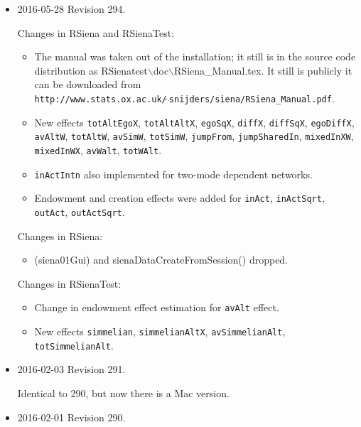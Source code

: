 \documentclass[a4paper,fleqn,11pt]{article}
\newcommand{\+}{\, + \,}
\newcommand{\sfn}[1]{\textsf{#1}}
\begin{document}
\begin{small}
\begin{itemize}
\item 2016-05-28 Revision 294.

Changes in RSiena and RSienaTest:
\begin{itemize}
   \item The manual was taken out of the installation;
   it still is in the source code distribution as
   RSienatest{$\backslash$}doc{$\backslash$}RSiena\_Manual.tex. It still is publicly
   it can be downloaded from \\
{\texttt{http://www.stats.ox.ac.uk/$\tilde{\ }$snijders/siena/RSiena\_Manual.pdf}}.
   \item New effects  \texttt{totAltEgoX}, \texttt{totAltAltX}, \texttt{egoSqX},
     \texttt{diffX}, \texttt{diffSqX}, \texttt{egoDiffX},
     \texttt{avAltW}, \texttt{totAltW}, \texttt{avSimW},
     \texttt{totSimW}, \texttt{jumpFrom}, \texttt{jumpSharedIn},
     \texttt{mixedInXW}, \texttt{mixedInWX},
     \texttt{avWalt},  \texttt{totWAlt}.
   \item \texttt{inActIntn} also implemented for two-mode dependent networks.
   \item Endowment and creation effects were added for
       \texttt{inAct}, \texttt{inActSqrt}, \texttt{outAct}, \texttt{outActSqrt}.
\end{itemize}
Changes in RSiena:
\begin{itemize}
   \item \sfn{(siena01Gui)} and \sfn{sienaDataCreateFromSession()} dropped.
\end{itemize}
Changes in RSienaTest:
\begin{itemize}
 \item Change in endowment effect estimation for \texttt{avAlt} effect.
   \item New effects
     \texttt{simmelian}, \texttt{simmelianAltX}, \texttt{avSimmelianAlt},
      \texttt{totSimmelianAlt}.
\end{itemize}

\item 2016-02-03 Revision 291.

Identical to 290, but now there is a Mac version.

\item 2016-02-01 Revision 290.


\end{itemize}
\end{small}
\end{document}
